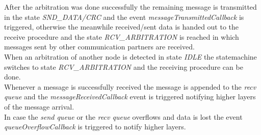 After the arbitration was done successfully the remaining message is transmitted in the state \textit{SND\_DATA/CRC} and the event \textit{messageTransmittedCallback} is triggered, otherwise the meanwhile received/sent data is handed out to the receive procedure and the state \textit{RCV\_ARBITRATION} is reached in which messages sent by other communication partners are received.\\

When an arbitration of another node is detected in state \textit{IDLE} the statemachine switches to state \textit{RCV\_ARBITRATION} and the receiving procedure can be done.\\

Whenever a message is successfully received the message is appended to the \textit{recv queue} and the \textit{messageReceivedCallback} event is triggered notifying higher layers of the message arrival.\\

In case the \textit{send queue} or the \textit{recv queue} overflows and data is lost the event \textit{queueOverflowCallback} is triggered to notify higher layers.\\